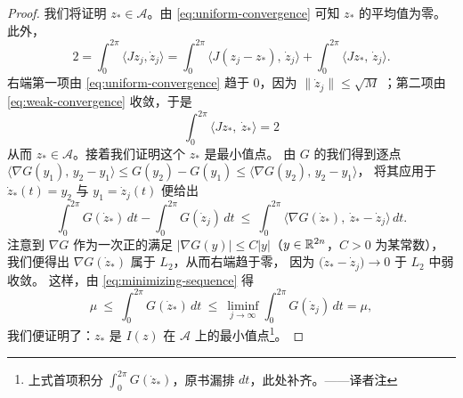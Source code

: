 \begin{proof}
我们将证明 $z_{*}\in\mathcal{A}$。由 \eqref{eq:uniform-convergence} 可知%
$z_{*}$ 的平均值为零。此外，
\[
2=\int_{0}^{2\pi}\langle Jz_{j},\dot{z}_{j}\rangle
 =\int_{0}^{2\pi}\bigl\langle J(z_{j}-z_{*}),\,\dot{z}_{j}\bigr\rangle
 +\int_{0}^{2\pi}\langle Jz_{*},\,\dot{z}_{j}\rangle.
\]
右端第一项由 \eqref{eq:uniform-convergence} 趋于 $0$，因为%
$\|\dot{z}_{j}\|\leq\sqrt{M}$ \trBounded；第二项由 \eqref{eq:weak-convergence} 收敛，于是
\[
\int_{0}^{2\pi}\langle Jz_{*},\ \dot{z}_{*}\rangle=2
\]
从而 $z_{*}\in\mathcal{A}$。接着我们证明这个 $z_{*}$ 是最小值点。%
由 $G$ 的\trConvexity{}我们得到逐点\trEstimate{}%
$\bigl\langle\nabla G(y_{1}),\,y_{2}-y_{1}\bigr\rangle\leq G(y_{2})-G(y_{1})\leq\bigl\langle\nabla G(y_{2}),\,y_{2}-y_{1}\bigr\rangle$，%
将其应用于 $\dot{z}_{*}(t)=y_{2}$ 与 $y_{1}=\dot{z}_{j}(t)$ 便给出
\[
\int_{0}^{2\pi}G(\dot{z}_{*})\,dt-\int_{0}^{2\pi}G(\dot{z}_{j})\,dt\ \leq\
\int_{0}^{2\pi}\bigl\langle\nabla G(\dot{z}_{*}),\ \dot{z}_{*}-\dot{z}_{j}\bigr\rangle\,dt.
\]
注意到 $\nabla G$ 作为一次正\trHomogeneous{}的\trMapping{}满足\trEstimate{}%
$|\nabla G(y)|\leq C|y|$（$y\in\mathbb{R}^{2n}$，$C>0$ 为某常数），%
我们便得出 $\nabla G(\dot{z}_{*})$ 属于 $L_{2}$，从而右端趋于零，%
因为 $\bigl(\dot{z}_{*}-\dot{z}_{j}\bigr)\rightarrow0$ 于 $L_{2}$ 中弱收敛。%
这样，由 \eqref{eq:minimizing-sequence} 得
\[
\mu\ \leq\ \int_{0}^{2\pi}G(\dot{z}_{*})\,dt\ \leq\
\liminf_{j\to\infty}\int_{0}^{2\pi}G(\dot{z}_{j})\,dt=\mu,
\]
我们便证明了：$z_{*}$ 是 $I(z)$ 在 $\mathcal{A}$ 上的最小值点\footnote{上式首项积分 $\int_{0}^{2\pi}G(\dot{z}_{*})$，原书漏排 $dt$，此处补齐。——译者注}。


\end{proof}
